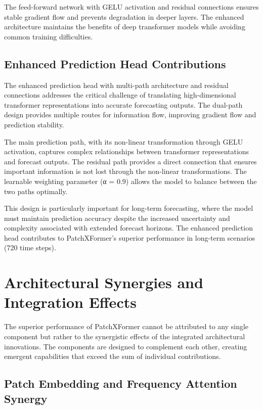 \documentclass[12pt]{uomthesis}
\begin{document}
The feed-forward network with GELU activation and residual connections ensures stable gradient flow and prevents degradation in deeper layers. The enhanced architecture maintains the benefits of deep transformer models while avoiding common training difficulties.

\subsection{Enhanced Prediction Head Contributions}

The enhanced prediction head with multi-path architecture and residual connections addresses the critical challenge of translating high-dimensional transformer representations into accurate forecasting outputs. The dual-path design provides multiple routes for information flow, improving gradient flow and prediction stability.

The main prediction path, with its non-linear transformation through GELU activation, captures complex relationships between transformer representations and forecast outputs. The residual path provides a direct connection that ensures important information is not lost through the non-linear transformations. The learnable weighting parameter (α = 0.9) allows the model to balance between the two paths optimally.

This design is particularly important for long-term forecasting, where the model must maintain prediction accuracy despite the increased uncertainty and complexity associated with extended forecast horizons. The enhanced prediction head contributes to PatchXFormer's superior performance in long-term scenarios (720 time steps).

\section{Architectural Synergies and Integration Effects}

The superior performance of PatchXFormer cannot be attributed to any single component but rather to the synergistic effects of the integrated architectural innovations. The components are designed to complement each other, creating emergent capabilities that exceed the sum of individual contributions.

\subsection{Patch Embedding and Frequency Attention Synergy}
\end{document}
